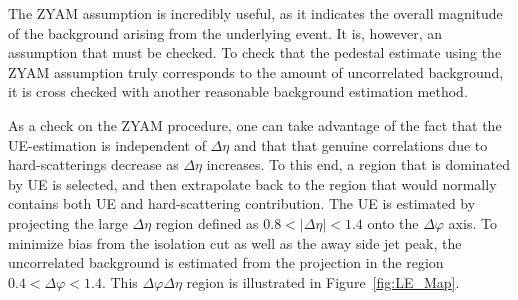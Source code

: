 The ZYAM assumption is incredibly useful, as it indicates the overall magnitude of the background arising from the underlying event. It is, however, an assumption that must be checked. To check that the pedestal estimate using the ZYAM assumption truly corresponds to the amount of uncorrelated background, it is cross checked with another reasonable background estimation method.


As a check on the ZYAM procedure, one can take advantage of the fact that the UE-estimation is independent of $\Delta\eta$ and that that genuine correlations due to hard-scatterings decrease as $\Delta\eta$ increases. To this end, a region that is dominated by UE is selected, and then extrapolate back to the region that would normally contains both UE and hard-scattering contribution. The UE is estimated by projecting the large $\Delta\eta$ region defined as $0.8 < |\Delta\eta| < 1.4$ onto the $\Delta\varphi$ axis. To minimize bias from the isolation cut as well as the away side jet peak, the uncorrelated background is estimated from the projection in the region $0.4 < \Delta\varphi < 1.4$. This $\Delta\varphi\Delta\eta$ region is illustrated in Figure~\ref{fig:LE_Map}. 

